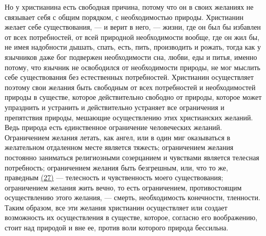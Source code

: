 \documentclass[12pt]{article}
\begin{document}
Но у христианина есть свободная причина, потому что он в своих желаниях не связывает себя с общим порядком, с необходимостью природы. Христианин желает себе существования, --- и верит в него, --- жизни, где он был бы избавлен от всех потребностей, от всей природной необходимости вообще, где он жил бы, не имея надобности дышать, спать, есть, пить, производить и рожать, тогда как у язычников даже бог подвержен необходимости сна, любви, еды и питья, именно потому, что язычник не освободился от необходимости природы, не мог мыслить себе существования без естественных потребностей. Христианин осуществляет поэтому свои желания быть свободным от всех потребностей и необходимостей природы в существе, которое действительно свободно от природы, которое может упразднить и устранить и действительно устраняет все ограничения и препятствия природы, мешающие осуществлению этих христианских желаний. Ведь природа есть единственное ограничение человеческих желаний. Ограничением желания летать, как ангел, или в один миг оказываться в желательном отдаленном месте является тяжесть; ограничением желания постоянно заниматься религиозными созерцанием и чувствами является телесная потребность; ограничением желания быть безгрешным, или, что то же, праведным \hyperlink{27}{(27)}\hypertarget{b27}{} --- телесность и чувственность моего существования; ограничением желания жить вечно, то есть ограничением, противостоящим осуществлению этого желания, --- смерть, необходимость конечности, тленности. Таким образом, все эти желания христианин осуществляет или создает возможность их осуществления в существе, которое, согласно его воображению, стоит над природой и вне ее, против воли которого природа бессильна. 
\end{document}
